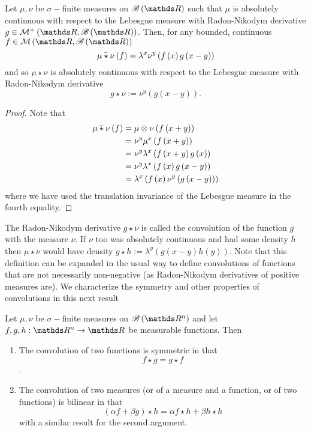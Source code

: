 \begin{prop}
\label{prop:convolutionFunctions}Let $\mu,\nu$ be $\sigma-$finite
measures on $\borel\left(\R\right)$ such that $\mu$ is absolutely
continuous with respect to the Lebesgue measure with Radon-Nikodym
derivative $g\in\mathcal{M}^{+}\left(\R,\borel\left(\R\right)\right)$.
Then, for any bounded, continuous $f\in\mathcal{M}\left(\R,\borel\left(\R\right)\right)$
\[
\bar{\mu\star\nu}\left(f\right)=\lambda^{x}\nu^{y}\left(f\left(x\right)g\left(x-y\right)\right)
\]
 and so $\mu\star\nu$ is absolutely continuous with respect to the
Lebesgue measure with Radon-Nikodym derivative 
\[
g\star\nu:=\nu^{y}\left(g\left(x-y\right)\right).
\]
\end{prop}

\begin{proof}
Note that 
\begin{align*}
\bar{\mu\star\nu}\left(f\right) & =\mu\otimes\nu\left(f\left(x+y\right)\right)\\
 & =\nu^{y}\mu^{x}\left(f\left(x+y\right)\right)\\
 & =\nu^{y}\lambda^{x}\left(f\left(x+y\right)g\left(x\right)\right)\\
 & =\nu^{y}\lambda^{x}\left(f\left(x\right)g\left(x-y\right)\right)\\
 & =\lambda^{x}\left(f\left(x\right)\nu^{y}\left(g\left(x-y\right)\right)\right)
\end{align*}
where we have used the translation invariance of the Lebesgue measure
in the fourth equality.
\end{proof}
The Radon-Nikodym derivative $g\star\nu$ is called the convolution
of the function $g$ with the measure $\nu$. If $\nu$ too was absolutely
continuous and had some density $h$ then $\mu\star\nu$ would have
density $g\star h:=\lambda^{y}\left(g\left(x-y\right)h\left(y\right)\right)$.
Note that this definition can be expanded in the usual way to define
convolutions of functions that are not necessarily non-negative (as
Radon-Nikodym derivatives of positive measures are). We characterize
the symmetry and other properties of convolutions in this next result
\begin{prop}
\label{prop:propertiesConvolution}Let $\mu,\nu$ be $\sigma-$finite
measures on $\borel\left(\R^{n}\right)$ and let $f,g,h:\R^{n}\to\R$
be measurable functions. Then

\begin{enumerate}[label=(\roman*),leftmargin=.1\linewidth,rightmargin=.4\linewidth]
\item The convolution of two functions is symmetric in that $$ f \star g = g \star f $$. 
\item The convolution of two measures (or of a measure and a function, or of two functions) is bilinear in that 
$$ (\alpha f + \beta g) \star h = \alpha f \star h + \beta h \star h $$ with a similar result for the second argument.
\end{enumerate}
\end{prop}

